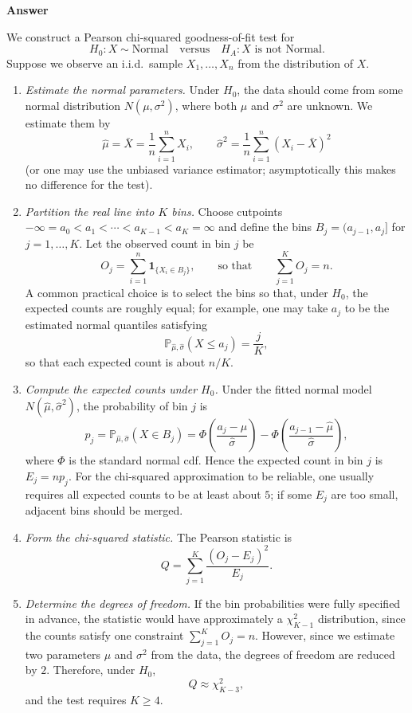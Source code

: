 \documentclass[letterpaper]{article}
\begin{document}
		\textbf{Answer}
		
		We construct a Pearson chi-squared goodness-of-fit test for
		$$H_0: X\sim \text{Normal} \quad \text{versus} \quad H_A: X \text{ is not Normal}.$$
		Suppose we observe an i.i.d.\ sample $X_1,\dots,X_n$ from the distribution of $X$.
		
		\begin{enumerate}
			\item \textit{Estimate the normal parameters.}
			Under $H_0$, the data should come from some normal distribution $N(\mu,\sigma^2)$, where both $\mu$ and $\sigma^2$ are unknown. We estimate them by
			$$\hat\mu=\bar X=\frac{1}{n}\sum_{i=1}^n X_i, \qquad \hat\sigma^2=\frac{1}{n}\sum_{i=1}^n (X_i-\bar X)^2$$
			(or one may use the unbiased variance estimator; asymptotically this makes no difference for the test).
			
			\item \textit{Partition the real line into $K$ bins.}
			Choose cutpoints $-\infty=a_0<a_1<\cdots<a_{K-1}<a_K=\infty$ and define the bins $B_j=(a_{j-1},a_j]$ for $j=1,\dots,K$. Let the observed count in bin $j$ be
			$$O_j=\sum_{i=1}^n \mathbf{1}_{\{X_i\in B_j\}}, \qquad \text{so that} \qquad \sum_{j=1}^K O_j=n.$$
			A common practical choice is to select the bins so that, under $H_0$, the expected counts are roughly equal; for example, one may take $a_j$ to be the estimated normal quantiles satisfying
			$$\mathbb{P}_{\hat\mu,\hat\sigma}(X\le a_j)=\frac{j}{K},$$
			so that each expected count is about $n/K$.
			
			\item \textit{Compute the expected counts under $H_0$.}
			Under the fitted normal model $N(\hat\mu,\hat\sigma^2)$, the probability of bin $j$ is
			$$p_j=\mathbb{P}_{\hat\mu,\hat\sigma}(X\in B_j)=\Phi\!\left(\frac{a_j-\hat\mu}{\hat\sigma}\right)-\Phi\!\left(\frac{a_{j-1}-\hat\mu}{\hat\sigma}\right),$$
			where $\Phi$ is the standard normal cdf. Hence the expected count in bin $j$ is $E_j=np_j$. For the chi-squared approximation to be reliable, one usually requires all expected counts to be at least about $5$; if some $E_j$ are too small, adjacent bins should be merged.
			
			\item \textit{Form the chi-squared statistic.}
			The Pearson statistic is
			$$Q=\sum_{j=1}^K \frac{(O_j-E_j)^2}{E_j}.$$
			
			\item \textit{Determine the degrees of freedom.}
			If the bin probabilities were fully specified in advance, the statistic would have approximately a $\chi^2_{K-1}$ distribution, since the counts satisfy one constraint $\sum_{j=1}^K O_j=n$. However, since we estimate two parameters $\mu$ and $\sigma^2$ from the data, the degrees of freedom are reduced by $2$. Therefore, under $H_0$,
			$$Q \approx \chi^2_{K-3},$$
			and the test requires $K\ge 4$.
			

\end{enumerate}
\end{document}
